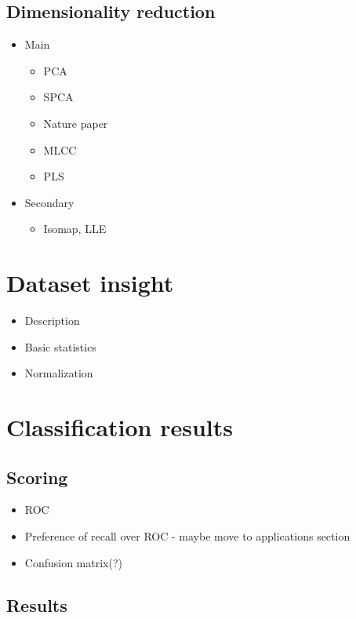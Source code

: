 \documentclass[12pt, wide]{mwart}
\begin{document}
\subsection{Dimensionality reduction}

\begin{itemize}
    \item Main
    \begin{itemize}
        \item PCA
        \item SPCA
        \item Nature paper
        \item MLCC
        \item PLS
    \end{itemize}
    \item Secondary
    \begin{itemize}
        \item Isomap, LLE
    \end{itemize}
\end{itemize}


\section{Dataset insight}

\begin{itemize}
    \item Description
    \item Basic statistics
    \item Normalization
\end{itemize}

\section{Classification results}

\subsection{Scoring}

\begin{itemize}
    \item ROC
    \item Preference of recall over ROC  - maybe move to applications section
    \item Confusion matrix(?)
\end{itemize}

\subsection{Results}
\end{document}
